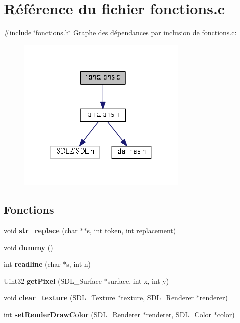 \section{Référence du fichier fonctions.\+c}
\label{fonctions_8c}
{\ttfamily \#include \char`\"{}fonctions.\+h\char`\"{}}\newline
Graphe des dépendances par inclusion de fonctions.\+c\+:
\nopagebreak
\begin{figure}[H]
\begin{center}
\leavevmode
\includegraphics[width=232pt]{fonctions_8c__incl}
\end{center}
\end{figure}
\subsection*{Fonctions}
\begin{DoxyCompactItemize}
\item 
void \textbf{ str\+\_\+replace} (char $\ast$$\ast$s, int token, int replacement)
\item 
\mbox{\label{fonctions_8c_a100d09f9a57d44745299c28c63c98745}} 
void {\bfseries dummy} ()
\item 
int \textbf{ readline} (char $\ast$s, int n)
\item 
\mbox{\label{fonctions_8c_a48c6792c544a90cd7a552667ce5bba4a}} 
Uint32 {\bfseries get\+Pixel} (S\+D\+L\+\_\+\+Surface $\ast$surface, int x, int y)
\item 
void \textbf{ clear\+\_\+texture} (S\+D\+L\+\_\+\+Texture $\ast$texture, S\+D\+L\+\_\+\+Renderer $\ast$renderer)
\item 
int \textbf{ set\+Render\+Draw\+Color} (S\+D\+L\+\_\+\+Renderer $\ast$renderer, S\+D\+L\+\_\+\+Color $\ast$color)
\end{DoxyCompactItemize}


